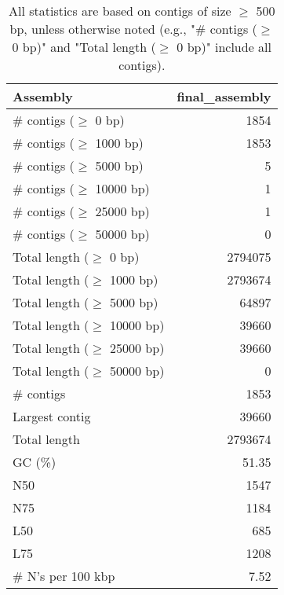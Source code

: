 \documentclass[12pt,a4paper]{article}
\begin{document}
\begin{table}[ht]
\begin{center}
\caption{All statistics are based on contigs of size $\geq$ 500 bp, unless otherwise noted (e.g., "\# contigs ($\geq$ 0 bp)" and "Total length ($\geq$ 0 bp)" include all contigs).}
\begin{tabular}{|l*{1}{|r}|}
\hline
Assembly & final\_assembly \\ \hline
\# contigs ($\geq$ 0 bp) & 1854 \\ \hline
\# contigs ($\geq$ 1000 bp) & 1853 \\ \hline
\# contigs ($\geq$ 5000 bp) & 5 \\ \hline
\# contigs ($\geq$ 10000 bp) & 1 \\ \hline
\# contigs ($\geq$ 25000 bp) & 1 \\ \hline
\# contigs ($\geq$ 50000 bp) & 0 \\ \hline
Total length ($\geq$ 0 bp) & 2794075 \\ \hline
Total length ($\geq$ 1000 bp) & 2793674 \\ \hline
Total length ($\geq$ 5000 bp) & 64897 \\ \hline
Total length ($\geq$ 10000 bp) & 39660 \\ \hline
Total length ($\geq$ 25000 bp) & 39660 \\ \hline
Total length ($\geq$ 50000 bp) & 0 \\ \hline
\# contigs & 1853 \\ \hline
Largest contig & 39660 \\ \hline
Total length & 2793674 \\ \hline
GC (\%) & 51.35 \\ \hline
N50 & 1547 \\ \hline
N75 & 1184 \\ \hline
L50 & 685 \\ \hline
L75 & 1208 \\ \hline
\# N's per 100 kbp & 7.52 \\ \hline
\end{tabular}
\end{center}
\end{table}
\end{document}
